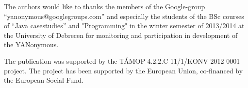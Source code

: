 The authors would like to thanks 
the members of the Google-group ``yanonymous@googlegroups.com'' and especially   
the students of the BSc courses of ``Java casestudies'' and "Programming"
in the winter semester of 2013/2014 at the University of Debrecen 
for monitoring and participation in development of the YANonymous.

The publication was supported by the T\'AMOP-4.2.2.C-11/1/KONV-2012-0001 project. The project has been supported by the European Union, co-financed by the European Social Fund.
